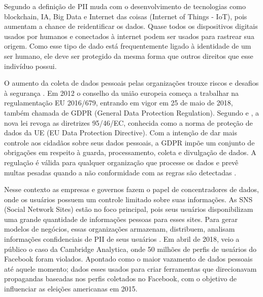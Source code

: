 
Segundo \citet{Schwerin2018} a definição de PII muda com o desenvolvimento de tecnologias como blockchain, IA, Big Data e Internet das coisas (Internet of Things - IoT), pois aumentam a chance de reidentificar os dados. %
Quase todos os dispositivos digitais usados por humanos e conectados à internet podem ser usados para rastrear sua origem. %
Como esse tipo de dado está frequentemente ligado à identidade de um ser humano, ele deve ser protegido da mesma forma que outros direitos que esse indivíduo possui.

O aumento da coleta de dados pessoais pelas organizações trouxe riscos e desafios à segurança \citep{Teixeira2019:article}. Em 2012 o conselho da união europeia começa a trabalhar na regulamentação EU 2016/679, entrando em vigor em 25 de maio de 2018, também chamada de GDPR (General Data Protection Regulation). Segundo \citet{gabriela_eu_2018:article} e \citet{Teixeira2019:article}, a nova lei revoga as diretrizes 95/46/EC, conhecida como a norma de proteção de dados da UE (EU Data Protection Directive). Com a intenção de dar mais controle aos cidadãos sobre seus dados pessoais, a GDPR impõe um conjunto de obrigações em respeito à guarda, processamento, coleta e divulgação de dados. A regulação é válida para qualquer organização que processe os dados e prevê multas pesadas quando a não conformidade com as regras são detectadas \citep{EuropeanCommission2016:misc}.

Nesse contexto as empresas e governos fazem o papel de concentradores de dados, onde os usuários possuem um controle limitado sobre suas informações. As SNS (Social Network Sites) estão no foco principal, pois seus usuários disponibilizam uma grande quantidade de informações pessoas para esses sites. Para gerar modelos de negócios, essas organizações armazenam, distribuem, analisam informações confidenciais de PII de seus usuários \cite{Al-ZabenNasr2018:article}. Em abril de 2018, veio a público o caso da Cambridge Analytica, onde 50 milhões de perfis de usuários do Facebook foram violados. Apontado como o maior vazamento de dados pessoais até aquele momento; dados esses usados para criar ferramentas que direcionavam propagandas baseadas nos perfis coletados no Facebook, com o objetivo de influenciar as eleições americanas em 2015.


